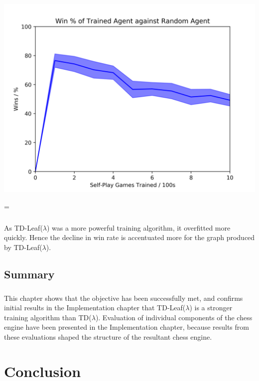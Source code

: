 \documentclass[12pt,a4paper]{book}
\newenvironment{absolutelynopagebreak}
{\par\nobreak\vfil\penalty0\vfilneg
  \vtop\bgroup}
{\par\xdef\tpd{\the\prevdepth}\egroup
  \prevdepth=\tpd}
\begin{document}
\begin{absolutelynopagebreak}
\begin{center}
  \includegraphics[scale=0.75]{winsreproduceleaf.png}
\end{center}
\end{absolutelynopagebreak}

\paragraph{} As TD-Leaf($\lambda$) was a more powerful training algorithm, it overfitted more quickly. Hence the decline in win rate is accentuated more for the graph produced by TD-Leaf($\lambda$).

\section{Summary}

\paragraph{} This chapter shows that the objective has been successfully met, and confirms initial results in the Implementation chapter that TD-Leaf($\lambda$) is a stronger training algorithm than TD($\lambda$). Evaluation of individual components of the chess engine have been presented in the Implementation chapter, because results from these evaluations shaped the structure of the resultant chess engine. %

\chapter{Conclusion}
\end{document}
